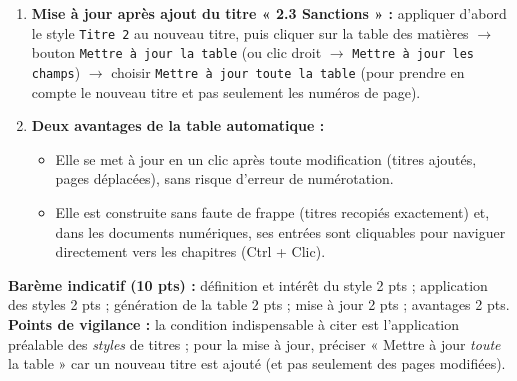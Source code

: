 \documentclass[11pt]{article}
\begin{document}
\begin{corrige}
\begin{enumerate}
\begin{enumerate}
\end{enumerate}
Le logiciel parcourt le document, repère tous les textes en styles \texttt{Titre 1} et \texttt{Titre 2}, et construit la table avec les numéros de page.
\item \textbf{Mise à jour après ajout du titre « 2.3 Sanctions » :} appliquer d'abord le style \texttt{Titre 2} au nouveau titre, puis cliquer sur la table des matières $\to$ bouton \texttt{Mettre à jour la table} (ou clic droit $\to$ \texttt{Mettre à jour les champs}) $\to$ choisir \texttt{Mettre à jour toute la table} (pour prendre en compte le nouveau titre et pas seulement les numéros de page).
\item \textbf{Deux avantages de la table automatique :}
\begin{itemize}
\item Elle se met à jour en un clic après toute modification (titres ajoutés, pages déplacées), sans risque d'erreur de numérotation.
\item Elle est construite sans faute de frappe (titres recopiés exactement) et, dans les documents numériques, ses entrées sont cliquables pour naviguer directement vers les chapitres (Ctrl + Clic).
\end{itemize}
\end{enumerate}
\textbf{Barème indicatif (10 pts) :} définition et intérêt du style 2 pts ; application des styles 2 pts ; génération de la table 2 pts ; mise à jour 2 pts ; avantages 2 pts.
\textbf{Points de vigilance :} la condition indispensable à citer est l'application préalable des \emph{styles} de titres ; pour la mise à jour, préciser « Mettre à jour \emph{toute} la table » car un nouveau titre est ajouté (et pas seulement des pages modifiées).
\end{corrige}
\end{document}
